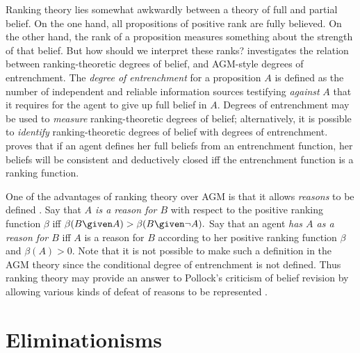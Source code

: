 Ranking theory lies somewhat awkwardly between a theory of full and partial
belief. On the one hand, all propositions of positive rank are fully believed.
On the other hand, the rank of a proposition measures something about the
strength of that belief. But how should we interpret these ranks?
\citet{huber2019ranking} investigates the relation between ranking-theoretic
degrees of belief, and AGM-style degrees of entrenchment. The {\em degree of
entrenchment} for a proposition $A$ is defined as the number of independent and
reliable information sources testifying {\em against} $A$ that it requires for
the agent to give up full belief in $A$. Degrees of entrenchment may be used to
{\em measure} ranking-theoretic degrees of belief; alternatively, it is possible
to {\em identify} ranking-theoretic degrees of belief with degrees of
entrenchment. \citet{huber2019belief} proves that if an agent defines her full
beliefs from an entrenchment function, her beliefs will be consistent and
deductively closed iff the entrenchment function is a ranking function.

One of the advantages of ranking theory over AGM is that it allows {\em reasons}
to be defined \citep{spohn2012laws}. Say that {\em $A$ is a reason for $B$} with
respect to the positive ranking function $\beta$ iff $\beta(B \given A)>\beta(B
\given \neg A).$ Say that an agent {\em has $A$ as a reason for $B$} iff $A$ is
a reason for $B$ according to her positive ranking function $\beta$ and
$\beta(A)>0$. Note that it is not possible to make such a definition in the AGM
theory since the conditional degree of entrenchment is not defined. Thus ranking
theory may provide an answer to Pollock's criticism of belief revision by
allowing various kinds of defeat of reasons to be represented \citep[Section
11.5]{spohn2012laws}.  


\section{Eliminationisms}

